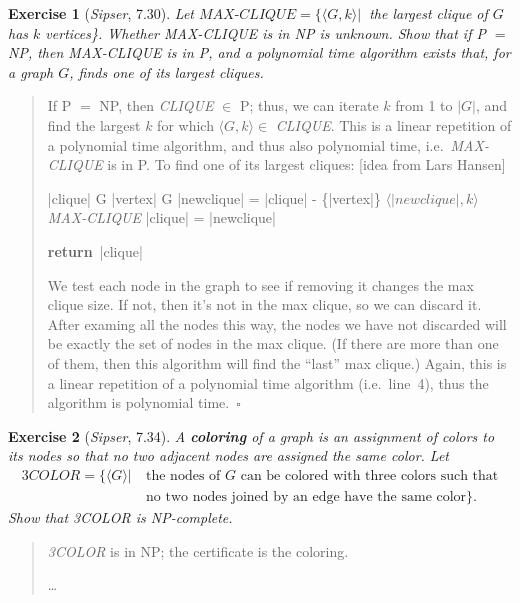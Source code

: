 \documentclass{article}
\theoremstyle{break}			%
\newtheorem{exercise}{Exercise}
\theoremstyle{plain}
\newenvironment{answer}{\begin{quotation}\noindent}{\end{quotation}}
\newcommand{\sipser}{\textit{Sipser}}
\newcommand{\encoding}[1]{\ensuremath{\langle#1\rangle}}
\renewcommand{\qed}{~\ensuremath{\square}}
\newcommand{\defin}[1]{\textbf{\textit{#1}}}
\newcommand{\setname}[1]{\textit{#1}}
\newcommand{\ENDFOR}{\untab\addtocounter{programline}{-1}}
\newcommand{\ENDIF}{\untab\untab\addtocounter{programline}{-1}}
\newcommand{\RETURN}{\keyword{return}\ }
\renewcommand{\keyword}[1]{\textbf{#1}}
\begin{document}
\begin{exercise}[\sipser, 7.30]
Let $\setname{MAX-CLIQUE}=\{\encoding{G,k}|~$ the \emph{largest} clique
of $G$ has $k$ vertices\}.  Whether \setname{MAX-CLIQUE} is in NP is
unknown.  Show that if P $=$ NP, then \setname{MAX-CLIQUE} is in P,
and a polynomial time algorithm exists that, for a graph $G$, finds
one of its largest cliques.
\end{exercise}
\begin{answer}
If P $=$ NP, then \setname{CLIQUE} $\in$ P; thus, we can iterate $k$
from 1 to $|G|$, and find the largest $k$ for which
$\encoding{G,k}\in$ \setname{CLIQUE}.  This is a linear repetition of
a polynomial time algorithm, and thus also polynomial time,
i.e.~\setname{MAX-CLIQUE} is in P.  To find one of its largest
cliques: [idea from Lars Hansen]

\begin{programbox}
|clique| \gets G
\FOREACH |vertex| \in G
	|newclique| = |clique| - \{|vertex|\}
	\IF \encoding{|newclique|,k} \in \setname{MAX-CLIQUE}
	\THEN	|clique| = |newclique|
	\ENDIF
\ENDFOR
\RETURN |clique|
\end{programbox}

We test each node in the graph to see if removing it changes the max
clique size.  If not, then it's not in the max clique, so we can
discard it.  After examing all the nodes this way, the nodes we have
not discarded will be exactly the set of nodes in the max clique.  (If
there are more than one of them, then this algorithm will find the
``last'' max clique.)  Again, this is a linear repetition of a
polynomial time algorithm (i.e.~line~4), thus the algorithm is
polynomial time.\qed
\end{answer}

\pagebreak
\begin{exercise}[\sipser, 7.34]\label{3color}
A \defin{coloring} of a graph is an assignment of colors to its nodes
so that no two adjacent nodes are assigned the same color.  Let
\begin{align*}
\setname{3COLOR} = \{\encoding{G}|~
&\text{the nodes of $G$ can be colored with three colors such that}\\
&\text{no two nodes joined by an edge have the same color}\}.
\end{align*}
Show that \setname{3COLOR} is NP-complete.
\end{exercise}
\begin{answer}
\setname{3COLOR} is in NP; the certificate is the coloring.

\ldots
\end{answer}
\end{document}
